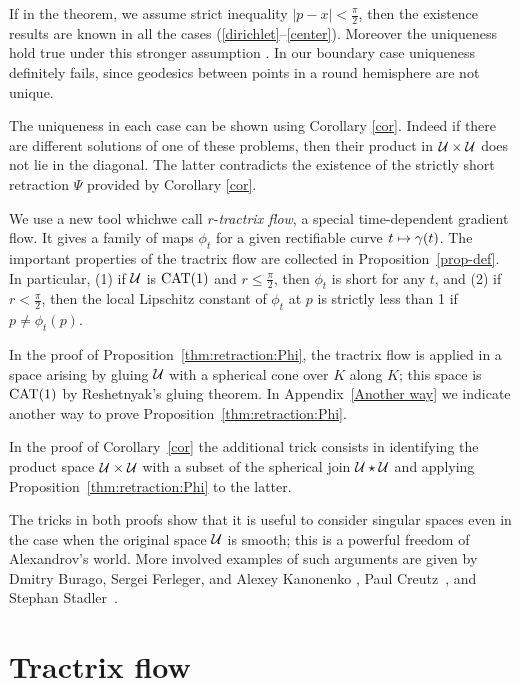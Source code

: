 \documentclass[oneside,a4paper, 12pt]{article}
\begin{document}
If in the theorem, we assume strict inequality $|p-x|< \tfrac\pi2$, then the existence results are known  in all the cases (\ref{dirichlet}--\ref{center}).
Moreover the uniqueness hold true under this stronger assumption
\cite{yokota,serbinowski}.
In our boundary case uniqueness definitely fails, since geodesics between points in a round hemisphere are not unique.

The uniqueness in each case can be shown using Corollary \ref{cor}.
Indeed if there are different solutions of one of these problems, then their product in ${\mathcal{U}}\times {\mathcal{U}}$ does not lie in the diagonal.
The latter contradicts the existence of the strictly short retraction $\Psi$ provided by Corollary \ref{cor}.

We use a new tool whichwe call $r$-\emph{tractrix flow}, a special  time-dependent gradient flow.
It gives a family of maps $\phi_t$ for a given rectifiable curve $t\z\mapsto\gamma(t)$.
The important properties of the tractrix flow are collected in Proposition~\ref{prop-def}.
In particular, (1) if $\mathcal{U}$ is $\mathrm{CAT}(1)$ and $r\le \tfrac\pi2$, then $\phi_t$ is short for any $t$, 
and (2) if $r< \tfrac\pi2$, then the local Lipschitz constant of $\phi_t$ at $p$ is strictly less than 1 if $p\ne \phi_t(p)$.

In the proof of Proposition~\ref{thm:retraction:Phi}, the tractrix flow is applied in a space arising by gluing $\mathcal{U}$ with a spherical cone over $K$ along $K$;
this space is $\mathrm{CAT}(1)$ by Reshetnyak's gluing theorem.
In Appendix~\ref{Another way} we indicate another way to prove Proposition~\ref{thm:retraction:Phi}.

In the proof of Corollary~\ref{cor} the additional trick consists in identifying the product space $\spc{U}\z\times \spc{U}$ with a subset of the spherical join $\mathcal{U}\star \mathcal{U}$ and applying  Proposition~\ref{thm:retraction:Phi} to the latter.

The tricks in both proofs show that it is useful to consider singular spaces even in the case when the original space $\mathcal{U}$ is smooth;
this is a powerful freedom of Alexandrov's world.
More involved examples of such arguments are given by Dmitry Burago, Sergei Ferleger, and Alexey Kanonenko \cite{BFK}, Paul Creutz~\cite{creutz}, and Stephan Stadler~\cite{stadler}. 

\section{Tractrix flow}\label{sec:Tractrix flow}
\end{document}
